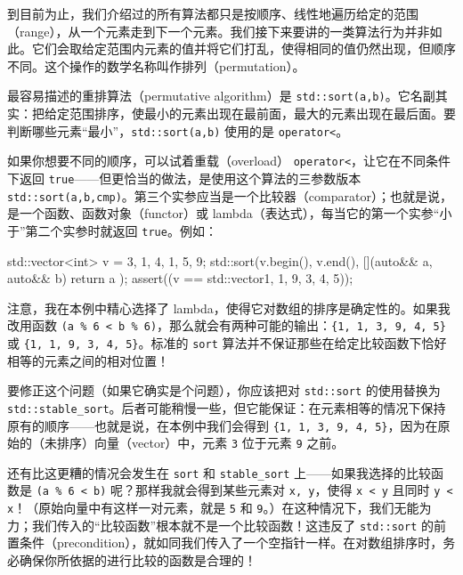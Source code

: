 到目前为止，我们介绍过的所有算法都只是按顺序、线性地遍历给定的范围（range），从一个元素走到下一个元素。我们接下来要讲的一类算法行为并非如此。它们会取给定范围内元素的值并将它们打乱，使得相同的值仍然出现，但顺序不同。这个操作的数学名称叫作排列（permutation）。

最容易描述的重排算法（permutative algorithm）是 \texttt{std::\allowbreak{}sort(\allowbreak{}a,\allowbreak{}b)\allowbreak{}}。它名副其实：把给定范围排序，使最小的元素出现在最前面，最大的元素出现在最后面。要判断哪些元素“最小”，\texttt{std::\allowbreak{}sort(\allowbreak{}a,\allowbreak{}b)\allowbreak{}} 使用的是 \texttt{operator<}。

如果你想要不同的顺序，可以试着重载（overload） \texttt{operator<}，让它在不同条件下返回 \texttt{true}——但更恰当的做法，是使用这个算法的三参数版本 \texttt{std::\allowbreak{}sort(\allowbreak{}a,\allowbreak{}b,\allowbreak{}cmp)\allowbreak{}}。第三个实参应当是一个比较器（comparator）；也就是说，是一个函数、函数对象（functor）或 lambda（表达式），每当它的第一个实参“小于”第二个实参时就返回 \texttt{true}。例如：

\begin{codebox}[cpp]
     std::vector<int> v = {3, 1, 4, 1, 5, 9};
     std::sort(v.begin(), v.end(), [](auto&& a, auto&& b) {
       return a %
     });
     assert((v == std::vector{1, 1, 9, 3, 4, 5}));
\end{codebox}

注意，我在本例中精心选择了 lambda，使得它对数组的排序是确定性的。如果我改用函数 \texttt{(\allowbreak{}a \% 6 < b \% 6)\allowbreak{}}，那么就会有两种可能的输出：\texttt{\{1,\allowbreak{} 1,\allowbreak{} 3,\allowbreak{} 9,\allowbreak{} 4,\allowbreak{} 5\}} 或 \texttt{\{1,\allowbreak{} 1,\allowbreak{} 9,\allowbreak{} 3,\allowbreak{} 4,\allowbreak{} 5\}}。标准的 \texttt{sort} 算法并不保证那些在给定比较函数下恰好相等的元素之间的相对位置！

要修正这个问题（如果它确实是个问题），你应该把对 \texttt{std::\allowbreak{}sort} 的使用替换为 \texttt{std::\allowbreak{}stable\_\allowbreak{}sort}。后者可能稍慢一些，但它能保证：在元素相等的情况下保持原有的顺序——也就是说，在本例中我们会得到 \texttt{\{1,\allowbreak{} 1,\allowbreak{} 3,\allowbreak{} 9,\allowbreak{} 4,\allowbreak{} 5\}}，因为在原始的（未排序）向量（vector）中，元素 \texttt{3} 位于元素 \texttt{9} 之前。

还有比这更糟的情况会发生在 \texttt{sort} 和 \texttt{stable\_\allowbreak{}sort} 上——如果我选择的比较函数是 \texttt{(\allowbreak{}a \% 6 < b)\allowbreak{}} 呢？那样我就会得到某些元素对 \texttt{x,\allowbreak{} y}，使得 \texttt{x < y} 且同时 \texttt{y < x}！（原始向量中有这样一对元素，就是 \texttt{5} 和 \texttt{9}。）在这种情况下，我们无能为力；我们传入的“比较函数”根本就不是一个比较函数！这违反了 \texttt{std::\allowbreak{}sort} 的前置条件（precondition），就如同我们传入了一个空指针一样。在对数组排序时，务必确保你所依据的进行比较的函数是合理的！

